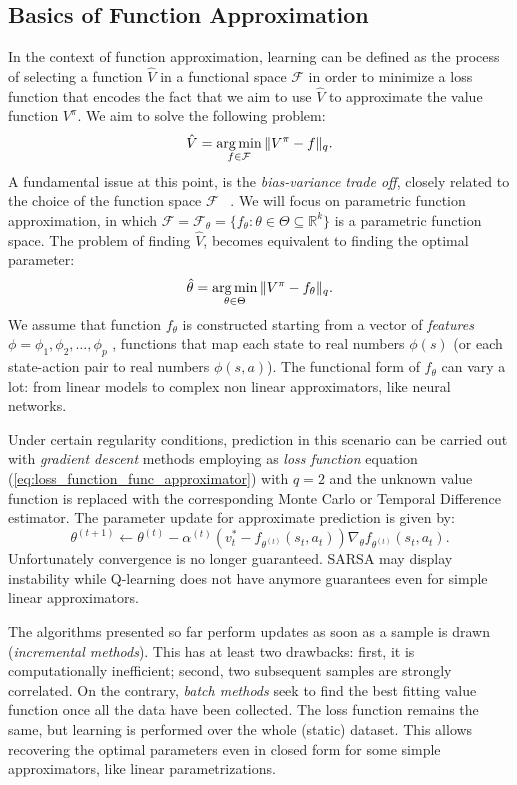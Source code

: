 \subsection{Basics of Function Approximation}
In the context of function approximation, learning can be defined as the process of
selecting a function $\hat{V}$ in a functional space $\mathcal{F}$ in order to minimize a loss function that encodes the fact that we aim to use $\hat{V}$ to approximate the value function $V^\pi$. We aim to solve the following problem:
\begin{equation}
\hat{V} = \operatorname*{arg\,min}_{f \in \mathcal{F} } \Vert V^\pi - f \Vert_{q}.
\end{equation}
A fundamental issue at this point, is the \emph{bias-variance trade off}, closely related to the choice of the function space $\mathcal{F}$ ~\cite{hastie01statisticallearning}. We will focus on parametric function approximation, in which $\mathcal{F} = \mathcal{F}_\theta = \{f_\theta : \theta \in \Theta \subseteq \mathbb{R}^k \}$ is a parametric function space. The problem of finding $\hat{V}$, becomes equivalent to finding the optimal parameter:
\begin{equation}
 \hat{\theta} = \operatorname*{arg\,min}_{\theta \in \Theta} \Vert V^\pi - f_{\theta} \Vert_{q}.
 \label{eq:loss_function_func_approximator}
\end{equation}
We assume that function $f_\theta$ is constructed starting from a vector of \emph{features} $\phi = \phi_1 , \phi_2 , \ldots, \phi_p$ , \ie functions that map each state to real numbers $\phi(s)$ (or each state-action pair to real numbers $\phi(s, a)$). The functional form of $f_\theta$ can vary a lot: from linear models to complex non linear approximators, like neural networks.\par
Under certain regularity conditions, prediction in this scenario can be carried out with \emph{gradient descent} methods employing as \emph{loss function} equation (\ref{eq:loss_function_func_approximator}) with $q=2$ and the unknown value function is replaced with the corresponding Monte Carlo or Temporal Difference estimator. The parameter update for approximate prediction is given by:
\begin{equation}
\theta^{(t+1)} \leftarrow \theta^{(t)} - \alpha^{(t)}(v^*_t - f_{\theta^{(t)}}(s_t,a_t)) \nabla_{\theta} f_{\theta^{(t)}}(s_t,a_t).
\end{equation}
Unfortunately convergence is no longer guaranteed. SARSA may display instability while Q-learning does not have anymore guarantees even for simple linear approximators. \par
The algorithms presented so far perform updates as soon as a sample is drawn
(\emph{incremental methods}). This has at least two drawbacks: first, it is computationally inefficient; second, two subsequent samples are strongly correlated. On the contrary, \emph{batch methods} seek to find the best fitting value function once all the data have been collected. The loss function remains the same, but learning is performed over the whole (static) dataset. This allows recovering the optimal parameters even in closed form for some simple approximators, like linear parametrizations.
